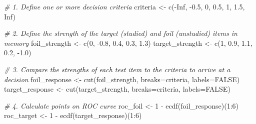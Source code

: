 \documentclass[
]{book}
\newenvironment{Shaded}{\begin{snugshade}}{\end{snugshade}}
\newcommand{\AttributeTok}[1]{\textcolor[rgb]{0.77,0.63,0.00}{#1}}
\newcommand{\CommentTok}[1]{\textcolor[rgb]{0.56,0.35,0.01}{\textit{#1}}}
\newcommand{\ConstantTok}[1]{\textcolor[rgb]{0.00,0.00,0.00}{#1}}
\newcommand{\DecValTok}[1]{\textcolor[rgb]{0.00,0.00,0.81}{#1}}
\newcommand{\FloatTok}[1]{\textcolor[rgb]{0.00,0.00,0.81}{#1}}
\newcommand{\FunctionTok}[1]{\textcolor[rgb]{0.00,0.00,0.00}{#1}}
\newcommand{\NormalTok}[1]{#1}
\newcommand{\OtherTok}[1]{\textcolor[rgb]{0.56,0.35,0.01}{#1}}
\newcommand{\SpecialCharTok}[1]{\textcolor[rgb]{0.00,0.00,0.00}{#1}}
\begin{document}
\begin{Shaded}
\begin{Highlighting}[]
\CommentTok{\# 1. Define one or more decision criteria}
\NormalTok{criteria }\OtherTok{\textless{}{-}} \FunctionTok{c}\NormalTok{(}\SpecialCharTok{{-}}\ConstantTok{Inf}\NormalTok{, }\SpecialCharTok{{-}}\FloatTok{0.5}\NormalTok{, }\DecValTok{0}\NormalTok{, }\FloatTok{0.5}\NormalTok{, }\DecValTok{1}\NormalTok{, }\FloatTok{1.5}\NormalTok{, }\ConstantTok{Inf}\NormalTok{)}

\CommentTok{\# 2. Define the strength of the target (studied) and foil (unstudied) items in memory}
\NormalTok{foil\_strength }\OtherTok{\textless{}{-}} \FunctionTok{c}\NormalTok{(}\DecValTok{0}\NormalTok{, }\SpecialCharTok{{-}}\FloatTok{0.8}\NormalTok{, }\FloatTok{0.4}\NormalTok{, }\FloatTok{0.3}\NormalTok{, }\FloatTok{1.3}\NormalTok{)}
\NormalTok{target\_strength }\OtherTok{\textless{}{-}} \FunctionTok{c}\NormalTok{(}\DecValTok{1}\NormalTok{, }\FloatTok{0.9}\NormalTok{, }\FloatTok{1.1}\NormalTok{, }\FloatTok{0.2}\NormalTok{, }\SpecialCharTok{{-}}\FloatTok{1.0}\NormalTok{)}

\CommentTok{\# 3. Compare the strengths of each test item to the criteria to arrive at a decision}
\NormalTok{foil\_response }\OtherTok{\textless{}{-}} \FunctionTok{cut}\NormalTok{(foil\_strength, }\AttributeTok{breaks=}\NormalTok{criteria, }\AttributeTok{labels=}\ConstantTok{FALSE}\NormalTok{)}
\NormalTok{target\_response }\OtherTok{\textless{}{-}} \FunctionTok{cut}\NormalTok{(target\_strength, }\AttributeTok{breaks=}\NormalTok{criteria, }\AttributeTok{labels=}\ConstantTok{FALSE}\NormalTok{)}

\CommentTok{\# 4. Calculate points on ROC curve}
\NormalTok{roc\_foil }\OtherTok{\textless{}{-}} \DecValTok{1} \SpecialCharTok{{-}} \FunctionTok{ecdf}\NormalTok{(foil\_response)(}\DecValTok{1}\SpecialCharTok{:}\DecValTok{6}\NormalTok{)}
\NormalTok{roc\_target }\OtherTok{\textless{}{-}} \DecValTok{1} \SpecialCharTok{{-}} \FunctionTok{ecdf}\NormalTok{(target\_response)(}\DecValTok{1}\SpecialCharTok{:}\DecValTok{6}\NormalTok{)}


\end{Highlighting}
\end{Shaded}
\end{document}
